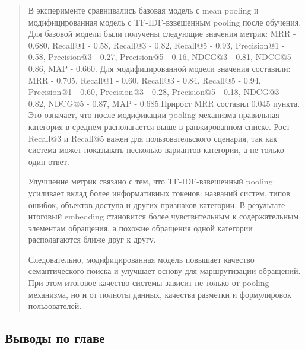 \begin{quote}
В эксперименте сравнивались базовая модель с mean pooling и
модифицированная модель с TF-IDF-взвешенным pooling после обучения. Для
базовой модели были получены следующие значения метрик: MRR - 0.680,
Recall@1 - 0.58, Recall@3 - 0.82, Recall@5 - 0.93, Precision@1 - 0.58,
Precision@3 - 0.27, Precision@5 - 0.16, NDCG@3 - 0.81, NDCG@5 - 0.86,
MAP - 0.660. Для модифицированной модели значения составили: MRR -
0.705, Recall@1 - 0.60, Recall@3 - 0.84, Recall@5 - 0.94, Precision@1 -
0.60, Precision@3 - 0.28, Precision@5 - 0.18, NDCG@3 - 0.82, NDCG@5 -
0.87, MAP - 0.685.Прирост MRR составил 0.045 пункта. Это означает, что
после модификации pooling-механизма правильная категория в среднем
располагается выше в ранжированном списке. Рост Recall@3 и Recall@5
важен для пользовательского сценария, так как система может показывать
несколько вариантов категории, а не только один ответ.

Улучшение метрик связано с тем, что TF-IDF-взвешенный pooling усиливает
вклад более информативных токенов: названий систем, типов ошибок,
объектов доступа и других признаков категории. В результате итоговый
embedding становится более чувствительным к содержательным элементам
обращения, а похожие обращения одной категории располагаются ближе друг
к другу.

Следовательно, модифицированная модель повышает качество семантического
поиска и улучшает основу для маршрутизации обращений. При этом итоговое
качество системы зависит не только от pooling-механизма, но и от полноты
данных, качества разметки и формулировок пользователей.
\end{quote}

\hypertarget{ux432ux44bux432ux43eux434ux44b-ux43fux43e-ux433ux43bux430ux432ux435}{%
\subsection{Выводы по
главе}\label{ux432ux44bux432ux43eux434ux44b-ux43fux43e-ux433ux43bux430ux432ux435}}

